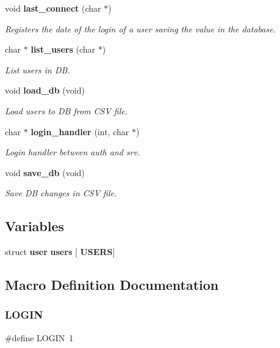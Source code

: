 \begin{DoxyCompactItemize}
void \textbf{ last\+\_\+connect} (char $\ast$)
\begin{DoxyCompactList}\small\item\em Registers the date of the login of a user saving the value in the database. \end{DoxyCompactList}\item 
char $\ast$ \textbf{ list\+\_\+users} (char $\ast$)
\begin{DoxyCompactList}\small\item\em List users in DB. \end{DoxyCompactList}\item 
void \textbf{ load\+\_\+db} (void)
\begin{DoxyCompactList}\small\item\em Load users to DB from C\+SV file. \end{DoxyCompactList}\item 
char $\ast$ \textbf{ login\+\_\+handler} (int, char $\ast$)
\begin{DoxyCompactList}\small\item\em Login handler between auth and srv. \end{DoxyCompactList}\item 
void \textbf{ save\+\_\+db} (void)
\begin{DoxyCompactList}\small\item\em Save DB changes in C\+SV file. \end{DoxyCompactList}\end{DoxyCompactItemize}
\subsection*{Variables}
\begin{DoxyCompactItemize}
\item 
struct \textbf{ user} \textbf{ users} [\textbf{ U\+S\+E\+RS}]
\end{DoxyCompactItemize}


\subsection{Macro Definition Documentation}
\mbox{\label{auth_8h_a2cc44bf853cfd679b56807b198735596}} 
\subsubsection{L\+O\+G\+IN}
{\footnotesize\ttfamily \#define L\+O\+G\+IN~1}

